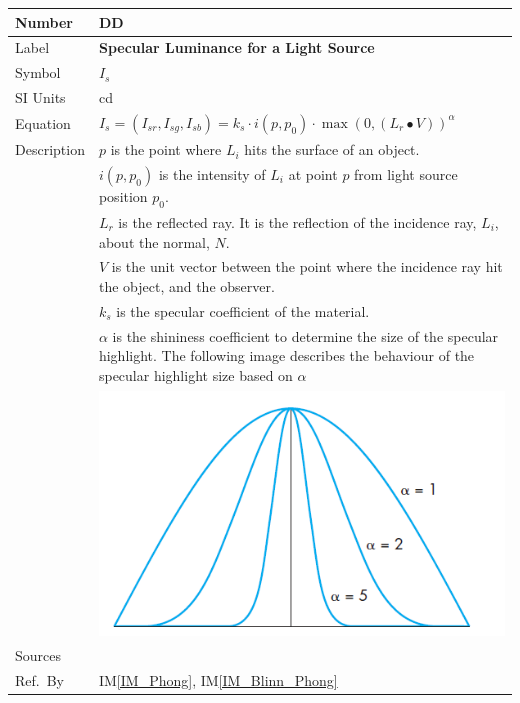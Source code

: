 \documentclass[12pt]{article}
\newcommand{\colAwidth}{0.13\textwidth}
\newcommand{\colBwidth}{0.82\textwidth}
\newcounter{defnum} %
\newcounter{datadefnum} %
\newcommand{\iref}[1]{IM\ref{#1}}
\begin{document}
\noindent
\begin{minipage}{\textwidth}
	\renewcommand*{\arraystretch}{1.5}
	\begin{tabular}{| p{\colAwidth} | p{\colBwidth}|}
		\hline
		\rowcolor[gray]{0.9}
		Number& DD{datadefnum}\thedatadefnum 
		\label{DD_Intensity_specular}\\
		\hline
		Label& \bf Specular Luminance for a Light Source\\
		\hline
		Symbol &$I_{s}$\\
		\hline
		SI Units & cd\\
		\hline
		Equation&$I_{s} = (I_{sr},I_{sg},I_{sb}) = 
		k_{s}\cdot i(p,p_{0}) \cdot \max(0, ({L_{r}}\bullet V))^\alpha$ \\
		\hline
		Description & $p$ is the point where $L_{i}$ hits the surface of an 
		object.
		\\
		& $i(p, p_{0})$ is the intensity of $L_{i}$ at point $p$ from light 
		source position $p_{0}$. \\
		& $L_{r}$ is the reflected ray. It is the reflection of the incidence 
		ray, $L_{i}$, about the normal, $N$.\\
		& $V$ is the unit vector between the point where the incidence ray hit 
		the object, and the observer. \\
		& $k_{s}$ is the specular coefficient of the material.\\
		& $\alpha$ is the shininess coefficient to determine the size of the 
		specular highlight. The following image describes the behaviour of the 
		specular highlight size based on $\alpha$\\
		& \includegraphics[]{./images/shininess-coefficient}\\
		\hline
		Sources& \cite{shreiner2012}\\
		\hline
		Ref.\ By & \iref{IM_Phong}, \iref{IM_Blinn_Phong}\\
		\hline
	\end{tabular}
\end{minipage}\\
\end{document}
